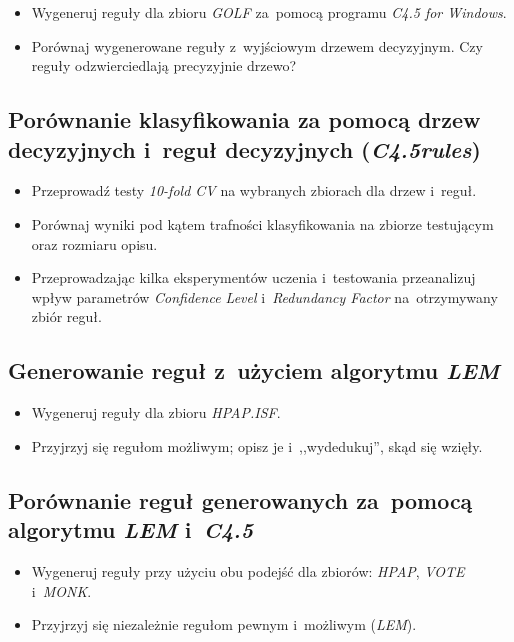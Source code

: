 \documentclass{article}
\begin{document}
\begin{itemize}
\item Wygeneruj reguły dla zbioru \emph{GOLF} za~pomocą programu \emph{C4.5 for Windows}.
\item Porównaj wygenerowane reguły z~wyjściowym drzewem decyzyjnym. Czy reguły odzwierciedlają precyzyjnie drzewo?
\end{itemize}

\subsection{Porównanie klasyfikowania za pomocą drzew decyzyjnych i~reguł decyzyjnych (\emph{C4.5rules})}

\begin{itemize}
\item Przeprowadź testy \emph{10-fold CV} na wybranych zbiorach dla drzew i~reguł.
\item Porównaj wyniki pod kątem trafności klasyfikowania na zbiorze testującym oraz rozmiaru opisu.
\item Przeprowadzając kilka eksperymentów uczenia i~testowania przeanalizuj wpływ parametrów \emph{Confidence Level} i~\emph{Redundancy Factor} na~otrzymywany zbiór reguł.
\end{itemize}

\subsection{Generowanie reguł z~użyciem algorytmu \emph{LEM}}

\begin{itemize}
\item Wygeneruj reguły dla zbioru \emph{HPAP.ISF}.
\item Przyjrzyj się regułom możliwym; opisz je i~,,wydedukuj'', skąd się wzięły.
\end{itemize}

\subsection{Porównanie reguł generowanych za~pomocą algorytmu \emph{LEM} i~\emph{C4.5}}

\begin{itemize}
\item Wygeneruj reguły przy użyciu obu podejść dla zbiorów: \emph{HPAP}, \emph{VOTE} i~\emph{MONK}.
\item Przyjrzyj się niezależnie regułom pewnym i~możliwym (\emph{LEM}).
\end{itemize}





\end{document}
